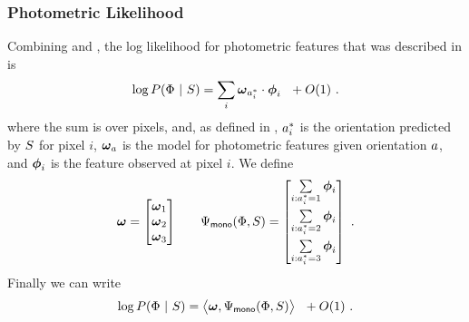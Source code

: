 \subsubsection{Photometric Likelihood}
Combining  and ,
the log likelihood for photometric features that was described in
 is
\begin{equation}
  \log P(\Features ~|~ \Seam) 
  =
  \sum_i \PixelModel_{\PredictedOrient_i} \cdot \Feature_i ~~ + O(1) ~.
\end{equation}
where the sum is over pixels, and, as defined in ,
$\PredictedOrient_i$ is the orientation predicted by $\Seam$ for pixel
$i$, $\PixelModel_\Orient$ is the model for photometric features given
orientation $\Orient$, and $\Feature_i$ is the feature observed at
pixel $i$. We define
\begin{align}
  \PixelModel =
  \begin{bmatrix}
    \PixelModel_1 \\
    \PixelModel_2 \\
    \PixelModel_3
  \end{bmatrix}
  & \quad &  
  \JointFtr_{\textsf{mono}}(\Features,\Seam) =
  \begin{bmatrix}
    \sum_{i:\PredictedOrient_i=1}\limits \Feature_i \vspace{1mm} \\
    \sum_{i:\PredictedOrient_i=2}\limits \Feature_i \vspace{1mm} \\
    \sum_{i:\PredictedOrient_i=3}\limits \Feature_i
  \end{bmatrix}~.
\end{align}
Finally we can write
\begin{equation}
  \label{eq:linear-photometric-model}
  \log P(\Features ~|~ \Seam) 
  =
  \bigl\langle \PixelModel, \JointFtr_{\textsf{mono}}(\Features,\Seam)
  \bigr\rangle ~~ + O(1) ~.
\end{equation}

